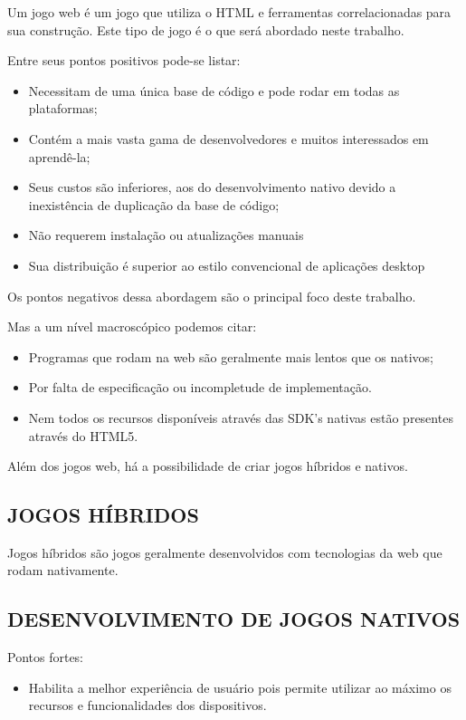 \documentclass[
12pt,
a4paper,
portuges,
draft
]{report}
\begin{document}
Um jogo web é um jogo que utiliza o HTML e
ferramentas correlacionadas para sua construção. Este tipo de jogo
é o que será abordado neste trabalho.

Entre seus pontos positivos pode-se listar:

\begin{itemize}
\item Necessitam de uma única base de código e pode rodar em todas as
plataformas;
\item Contém a mais vasta gama de desenvolvedores e muitos
interessados em aprendê-la;
\item Seus custos são inferiores, aos do desenvolvimento nativo devido a 
inexistência de duplicação da base de código;
\item  Não requerem instalação ou atualizações manuais
\item  Sua distribuição é superior ao estilo convencional de aplicações desktop\autocite{browserGamesTechnologyAndFuture}
\end{itemize}

Os pontos negativos dessa abordagem são o principal foco deste trabalho.

Mas a um nível macroscópico podemos citar:
\begin{itemize}
\item Programas que rodam na web são geralmente mais lentos que os
nativos;
\item Por falta de especificação ou incompletude de implementação.
\item Nem todos os recursos disponíveis através das SDK's nativas estão presentes através do HTML5.
\end{itemize}

Além dos jogos web, há a possibilidade de criar jogos híbridos e nativos.

\subsection{JOGOS HÍBRIDOS}

Jogos híbridos são jogos geralmente desenvolvidos com tecnologias da
web que rodam nativamente.

\subsection{DESENVOLVIMENTO DE JOGOS NATIVOS}

Pontos fortes:
\begin{itemize}
\item Habilita a melhor experiência de usuário pois permite utilizar ao
máximo os recursos e funcionalidades dos dispositivos.
\end{itemize}
\end{document}
